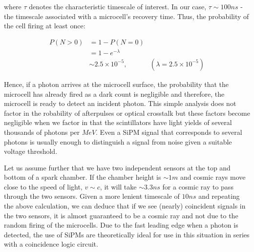 \noindent where $\tau$ denotes the characteristic timescale of interest. In our case, $\tau \sim 100ns$ - the timescale associated with a microcell's recovery time. Thus, the probability of the cell firing at least once:

\begin{align*}
  P(N>0) &= 1-P(N=0)& \\
  &= 1-e^{-\lambda}& \\
  &\sim 2.5\times 10^{-5}, & (\lambda = 2.5\times 10^{-5})
\end{align*}

\noindent Hence, if a photon arrives at the microcell surface, the probability that the microcell has already fired as a dark count is negligible and therefore, the microcell is ready to detect an incident photon. This simple analysis does not factor in the robability of afterpulses or optical crosstalk but these factors become negligible when we factor in that the scintillators have light yields of several thousands of photons per $MeV$. \cite{herbert2006} Even a SiPM signal that corresponds to several photons is usually enough to distinguish a signal from noise given a suitable voltage threshold.

Let us assume further that we have two independent sensors at the top and bottom of a spark chamber. If the chamber height is $\sim 1m$ and cosmic rays move close to the speed of light, $v\sim c$, it will take $\sim 3.3ns$ for a cosmic ray to pass through the two sensors. Given a more lenient timescale of $10ns$ and repeating the above calculation, we can deduce that if we see (nearly) coincident signals in the two sensors, it is almost guaranteed to be a cosmic ray and not due to the random firing of the microcells. Due to the fast leading edge when a photon is detected, the use of SiPMs are theoretically ideal for use in this situation in series with a coincidence logic circuit.
